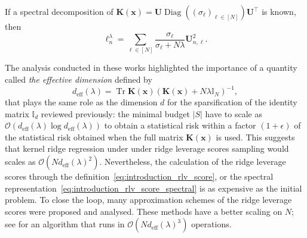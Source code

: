 \documentclass[twoside,11pt]{book}
\numberwithin{theorem}{chapter}
\numberwithin{definition}{chapter}
\numberwithin{proposition}{chapter}
\numberwithin{corollary}{chapter}
\numberwithin{example}{chapter}
\numberwithin{lemma}{chapter}
\numberwithin{assumption}{chapter}
\numberwithin{equation}{chapter}
\numberwithin{figure}{chapter}
\DeclareMathOperator{\Tr}{Tr}
\DeclareMathOperator{\Diag}{\mathrm{Diag}}
\DeclareMathOperator{\eff}{\mathrm{eff}}
\DeclareMathOperator{\Tran}{\intercal}
\begin{document}
If a spectral decomposition of $\bm{K}(\bm{x}) = \bm{U}\Diag((\sigma_{\ell})_{ \ell \in [N]})\bm{U}^{\Tran}$ is known, then 
\begin{equation}\label{eq:introduction_rlv_score_spectral}
\ell^{\lambda}_{n} = \sum\limits_{\ell \in [N]} \frac{\sigma_{\ell}}{\sigma_\ell + N\lambda}  \bm{U}_{n,\ell}^{2}.
\end{equation}

The analysis conducted in these works highlighted the importance of a quantity called \emph{the effective dimension} defined by
\begin{equation}
d_{\eff}(\lambda) = \Tr \bm{K}(\bm{x})(\bm{K}(\bm{x})+ N\lambda \mathbb{I}_{N})^{-1},
\end{equation}
 that plays the same role as the dimension $d$ for the sparsification of the identity matrix $\mathbb{I}_{d}$ reviewed previously: the minimal  budget $|S|$ have to scale as $\mathcal{O}(d_{\eff}(\lambda) \log d_{\eff}(\lambda))$ to obtain a statistical risk within a factor $(1+\epsilon)$ of the statistical risk obtained when the full matrix $\bm{K}(\bm{x})$ is used.
 This suggests that kernel ridge regression under under ridge leverage scores sampling would scales as $\mathcal{O}(N d_{\eff}(\lambda)^{2})$. 
  Nevertheless, the calculation of the ridge leverage scores through the definition~\eqref{eq:introduction_rlv_score}, or the spectral representation~\eqref{eq:introduction_rlv_score_spectral} is as expensive as the initial problem. To close the loop, many approximation schemes of the ridge leverage scores were proposed and analysed. These methods have a better scaling on $N$; see \citep*{CaLaVa17,Cal17} for an algorithm that runs in $\mathcal{O}(N d_{\eff}(\lambda)^{3})$ operations.









\end{document}
